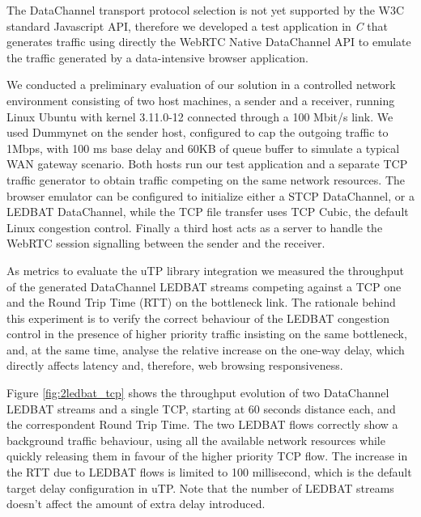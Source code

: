 \documentclass{sig-alternate}
\begin{document}
The DataChannel transport protocol selection is not yet supported by the W3C standard Javascript API, therefore we developed a test application in \textit{C} that generates traffic using directly the WebRTC Native DataChannel API to emulate the traffic generated by a data-intensive browser application.

\label{sec:architecture}


We conducted a preliminary evaluation of our solution in a controlled network environment consisting of two host machines, a sender and a receiver, running Linux Ubuntu with kernel 3.11.0-12 connected through a 100 Mbit/s link. We used Dummynet on the sender host, configured to cap the outgoing traffic to 1Mbps, with 100 ms base delay and 60KB of queue buffer to simulate a typical WAN gateway scenario. Both hosts run our test application and a separate TCP traffic generator to obtain traffic competing on the same network resources. The browser emulator can be configured to initialize either a STCP DataChannel, or a LEDBAT DataChannel, while the TCP file transfer uses TCP Cubic, the default Linux congestion control. Finally a third host acts as a server to handle the WebRTC session signalling between the sender and the receiver.

As metrics to evaluate the uTP library integration we measured the throughput of the generated DataChannel LEDBAT streams competing against a TCP one and the Round Trip Time (RTT) on the bottleneck link. The rationale behind this experiment is to verify the correct behaviour of the LEDBAT congestion control in the presence of higher priority traffic insisting on the same bottleneck, and, at the same time, analyse the relative increase on the one-way delay, which directly affects latency and, therefore, web browsing responsiveness. 

Figure \ref{fig:2ledbat_tcp} shows the throughput evolution of two DataChannel LEDBAT streams and a single TCP, starting at 60 seconds distance each, and the correspondent Round Trip Time. The two LEDBAT flows correctly show a background traffic behaviour, using all the available network resources while quickly releasing them in favour of the higher priority TCP flow. The increase in the RTT due to LEDBAT flows is limited to 100 millisecond, which is the default target delay configuration in uTP. Note that the number of LEDBAT streams doesn't affect the amount of extra delay introduced.
\end{document}
